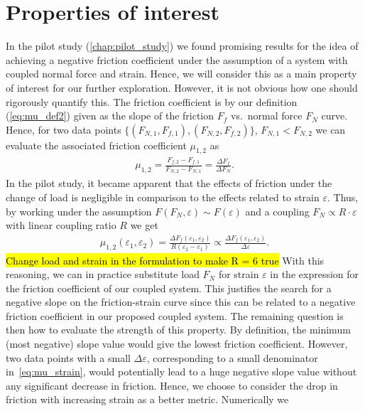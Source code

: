 \section{Properties of interest} 
In the pilot study (\cref{chap:pilot_study}) we found promising results for the idea of achieving a negative friction coefficient under the assumption of a system with coupled normal force and strain. Hence, we will consider this as a main property of interest for our further exploration. However, it is not obvious how one should rigorously quantify this. The friction coefficient is by our definition (\cref{eq:mu_def2}) given as the slope of the friction $F_f$ vs.\ normal force $F_N$ curve. Hence, for two data points $\{(F_{N,1}, F_{f,1}), (F_{N,2}, F_{f,2})\}$, $F_{N,1} < F_{N,2}$ we can evaluate the associated friction coefficient $\mu_{1,2}$ as 
\begin{align*}
  \mu_{1,2} = \frac{F_{f,2} - F_{f,1}}{F_{N,2} - F_{N,1}} = \frac{\Delta F_f}{\Delta F_N}.
\end{align*}
In the pilot study, it became apparent that the effects of friction under the
change of load is negligible in comparison to the effects related to strain $\varepsilon$.
Thus, by working under the assumption $F(F_N, \varepsilon) \sim F(\varepsilon)$ and a coupling $F_N
\propto R\cdot \varepsilon$ with linear coupling ratio $R$ we get 
\begin{align}
  \mu_{1,2}(\varepsilon_1, \varepsilon_2) = \frac{\Delta F_{f}(\varepsilon_1, \varepsilon_2)}{R(\varepsilon_2 - \varepsilon_1)} \propto \frac{\Delta F_{f}(\varepsilon_1, \varepsilon_2)}{\Delta \varepsilon}.
  \label{eq:mu_strain}
\end{align}
\hl{Change load and strain in the formulation to make R = 6 true}
With this reasoning, we can in practice substitute load $F_N$ for strain
$\varepsilon$ in the expression for the friction coefficient of our coupled
system. This justifies the search for a negative slope on the friction-strain
curve since this can be related to a negative friction coefficient in our
proposed coupled system. The remaining question is then how to evaluate the
strength of this property. By definition, the minimum (most negative) slope
value would give the lowest friction coefficient. However, two data points with
a small $\Delta \varepsilon$, corresponding to a small denominator
in~\cref{eq:mu_strain}, would potentially lead to a huge negative slope value
without any significant decrease in friction. Hence, we choose to consider the
drop in friction with increasing strain as a better metric. Numerically we
